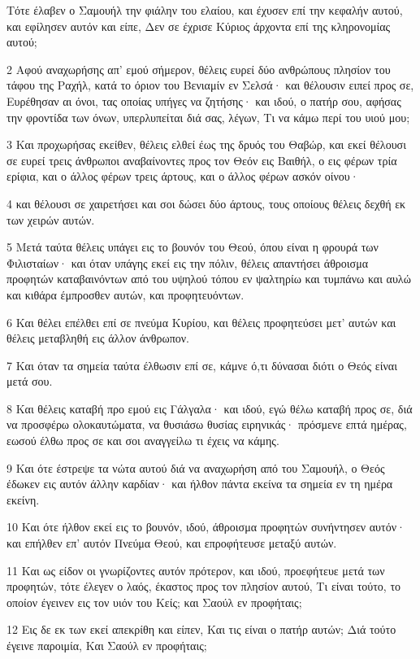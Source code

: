 \par Τότε έλαβεν ο Σαμουήλ την φιάλην του ελαίου, και έχυσεν επί την κεφαλήν αυτού, και εφίλησεν αυτόν και είπε, Δεν σε έχρισε Κύριος άρχοντα επί της κληρονομίας αυτού;
\par 2 Αφού αναχωρήσης απ' εμού σήμερον, θέλεις ευρεί δύο ανθρώπους πλησίον του τάφου της Ραχήλ, κατά το όριον του Βενιαμίν εν Σελσά· και θέλουσιν ειπεί προς σε, Ευρέθησαν αι όνοι, τας οποίας υπήγες να ζητήσης· και ιδού, ο πατήρ σου, αφήσας την φροντίδα των όνων, υπερλυπείται διά σας, λέγων, Τι να κάμω περί του υιού μου;
\par 3 Και προχωρήσας εκείθεν, θέλεις ελθεί έως της δρυός του Θαβώρ, και εκεί θέλουσι σε ευρεί τρεις άνθρωποι αναβαίνοντες προς τον Θεόν εις Βαιθήλ, ο εις φέρων τρία ερίφια, και ο άλλος φέρων τρεις άρτους, και ο άλλος φέρων ασκόν οίνου·
\par 4 και θέλουσι σε χαιρετήσει και σοι δώσει δύο άρτους, τους οποίους θέλεις δεχθή εκ των χειρών αυτών.
\par 5 Μετά ταύτα θέλεις υπάγει εις το βουνόν του Θεού, όπου είναι η φρουρά των Φιλισταίων· και όταν υπάγης εκεί εις την πόλιν, θέλεις απαντήσει άθροισμα προφητών καταβαινόντων από του υψηλού τόπου εν ψαλτηρίω και τυμπάνω και αυλώ και κιθάρα έμπροσθεν αυτών, και προφητευόντων.
\par 6 Και θέλει επέλθει επί σε πνεύμα Κυρίου, και θέλεις προφητεύσει μετ' αυτών και θέλεις μεταβληθή εις άλλον άνθρωπον.
\par 7 Και όταν τα σημεία ταύτα έλθωσιν επί σε, κάμνε ό,τι δύνασαι διότι ο Θεός είναι μετά σου.
\par 8 Και θέλεις καταβή προ εμού εις Γάλγαλα· και ιδού, εγώ θέλω καταβή προς σε, διά να προσφέρω ολοκαυτώματα, να θυσιάσω θυσίας ειρηνικάς· πρόσμενε επτά ημέρας, εωσού έλθω προς σε και σοι αναγγείλω τι έχεις να κάμης.
\par 9 Και ότε έστρεψε τα νώτα αυτού διά να αναχωρήση από του Σαμουήλ, ο Θεός έδωκεν εις αυτόν άλλην καρδίαν· και ήλθον πάντα εκείνα τα σημεία εν τη ημέρα εκείνη.
\par 10 Και ότε ήλθον εκεί εις το βουνόν, ιδού, άθροισμα προφητών συνήντησεν αυτόν· και επήλθεν επ' αυτόν Πνεύμα Θεού, και επροφήτευσε μεταξύ αυτών.
\par 11 Και ως είδον οι γνωρίζοντες αυτόν πρότερον, και ιδού, προεφήτευε μετά των προφητών, τότε έλεγεν ο λαός, έκαστος προς τον πλησίον αυτού, Τι είναι τούτο, το οποίον έγεινεν εις τον υιόν του Κείς; και Σαούλ εν προφήταις;
\par 12 Εις δε εκ των εκεί απεκρίθη και είπεν, Και τις είναι ο πατήρ αυτών; Διά τούτο έγεινε παροιμία, Και Σαούλ εν προφήταις;
